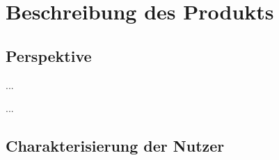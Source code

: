 \documentclass[12pt]{article} %
\begin{document}
\section{Beschreibung des Produkts}

\subsection{Perspektive}
...






...

\subsection{Charakterisierung der Nutzer}





\end{document}

